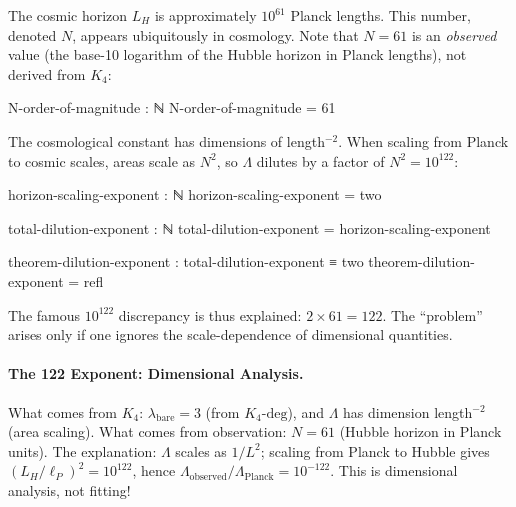 \documentclass[11pt,a4paper]{book}
\begin{document}
The cosmic horizon $L_H$ is approximately $10^{61}$ Planck lengths. This number, denoted $N$, 
appears ubiquitously in cosmology. Note that $N = 61$ is an \emph{observed} value 
(the base-10 logarithm of the Hubble horizon in Planck lengths), not derived from $K_4$:

\begin{code}
  N-order-of-magnitude : ℕ
  N-order-of-magnitude = 61
\end{code}

The cosmological constant has dimensions of length$^{-2}$. When scaling from Planck to 
cosmic scales, areas scale as $N^2$, so $\Lambda$ dilutes by a factor of $N^2 = 10^{122}$:

\begin{code}
  horizon-scaling-exponent : ℕ
  horizon-scaling-exponent = two
  
  total-dilution-exponent : ℕ
  total-dilution-exponent = horizon-scaling-exponent
  
  theorem-dilution-exponent : total-dilution-exponent ≡ two
  theorem-dilution-exponent = refl
\end{code}

The famous $10^{122}$ discrepancy is thus explained: $2 \times 61 = 122$. The ``problem'' 
arises only if one ignores the scale-dependence of dimensional quantities.

\paragraph{The 122 Exponent: Dimensional Analysis.}
What comes from $K_4$: $\lambda_{\text{bare}} = 3$ (from $K_4\text{-deg}$), 
and $\Lambda$ has dimension length$^{-2}$ (area scaling).
What comes from observation: $N = 61$ (Hubble horizon in Planck units).
The explanation: $\Lambda$ scales as $1/L^2$; scaling from Planck to Hubble gives 
$(L_H/\ell_P)^2 = 10^{122}$, hence $\Lambda_{\text{observed}}/\Lambda_{\text{Planck}} = 10^{-122}$.
This is dimensional analysis, not fitting!
\end{document}
